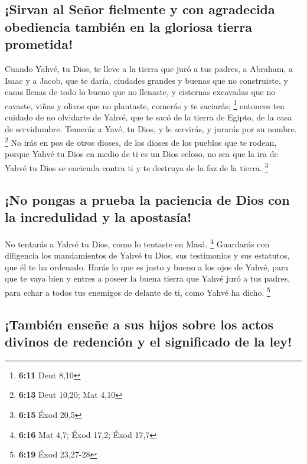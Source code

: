\hypertarget{sirvan-al-seuxf1or-fielmente-y-con-agradecida-obediencia-tambiuxe9n-en-la-gloriosa-tierra-prometida}{%
\subsection{¡Sirvan al Señor fielmente y con agradecida obediencia
también en la gloriosa tierra
prometida!}\label{sirvan-al-seuxf1or-fielmente-y-con-agradecida-obediencia-tambiuxe9n-en-la-gloriosa-tierra-prometida}}

 Cuando Yahvé, tu Dios, te lleve a la tierra que juró a
tus padres, a Abraham, a Isaac y a Jacob, que te daría, ciudades grandes
y buenas que no construiste,  y casas llenas de todo lo
bueno que no llenaste, y cisternas excavadas que no cavaste, viñas y
olivos que no plantaste, comerás y te saciarás; \footnote{\textbf{6:11}
  Deut 8,10}  entonces ten cuidado de no olvidarte de
Yahvé, que te sacó de la tierra de Egipto, de la casa de servidumbre.
 Temerás a Yavé, tu Dios, y le servirás, y jurarás por su
nombre. \footnote{\textbf{6:13} Deut 10,20; Mat 4,10}  No
irás en pos de otros dioses, de los dioses de los pueblos que te rodean,
 porque Yahvé tu Dios en medio de ti es un Dios celoso,
no sea que la ira de Yahvé tu Dios se encienda contra ti y te destruya
de la faz de la tierra. \footnote{\textbf{6:15} Éxod 20,5}

\hypertarget{no-pongas-a-prueba-la-paciencia-de-dios-con-la-incredulidad-y-la-apostasuxeda}{%
\subsection{¡No pongas a prueba la paciencia de Dios con la incredulidad
y la
apostasía!}\label{no-pongas-a-prueba-la-paciencia-de-dios-con-la-incredulidad-y-la-apostasuxeda}}

 No tentarás a Yahvé tu Dios, como lo tentaste en Masá.
\footnote{\textbf{6:16} Mat 4,7; Éxod 17,2; Éxod 17,7} 
Guardarás con diligencia los mandamientos de Yahvé tu Dios, sus
testimonios y sus estatutos, que él te ha ordenado. 
Harás lo que es justo y bueno a los ojos de Yahvé, para que te vaya bien
y entres a poseer la buena tierra que Yahvé juró a tus padres,
 para echar a todos tus enemigos de delante de ti, como
Yahvé ha dicho. \footnote{\textbf{6:19} Éxod 23,27-28}

\hypertarget{tambiuxe9n-enseuxf1e-a-sus-hijos-sobre-los-actos-divinos-de-redenciuxf3n-y-el-significado-de-la-ley}{%
\subsection{¡También enseñe a sus hijos sobre los actos divinos de
redención y el significado de la
ley!}\label{tambiuxe9n-enseuxf1e-a-sus-hijos-sobre-los-actos-divinos-de-redenciuxf3n-y-el-significado-de-la-ley}}

